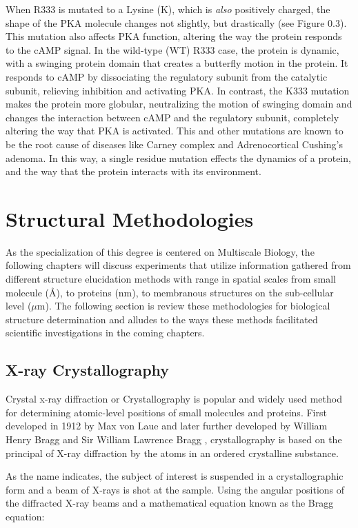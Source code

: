 \documentclass[12pt]{ucsddissertation}
\begin{document}
\begin{dissertationintroduction}
 When R333  is mutated to a Lysine (K), which is \textit{also} positively charged, the shape of the PKA molecule changes not slightly, but drastically (see Figure 0.3). This mutation also affects PKA function, altering the way the protein responds to the cAMP signal. In the wild-type (WT) R333 case, the protein is dynamic, with a swinging protein domain that creates a butterfly motion in the protein. It responds to cAMP by dissociating the regulatory subunit from the catalytic subunit, relieving inhibition and activating PKA. In contrast, the K333 mutation makes the protein more globular, neutralizing the motion of swinging domain\cite{Cheng2009} and changes the interaction between cAMP and the regulatory subunit, completely altering the way that PKA is activated. This and other mutations are known to be the root cause of diseases like Carney complex\cite{Kirschner2000} and Adrenocortical Cushing’s adenoma\cite{Calebiro2014}. In this way, a single residue mutation effects the dynamics of a protein, and the way that the protein interacts with its environment. 


\section{Structural Methodologies}

As the specialization of this degree is centered on Multiscale Biology, the following chapters will discuss experiments that utilize information gathered from different structure elucidation methods with range in spatial scales from small molecule (\si{\angstrom}), to proteins (nm), to membranous structures on the sub-cellular level ($\mu$m). The following section is review these methodologies for biological structure determination and alludes to the ways these methods facilitated scientific investigations in the coming chapters. 

\subsection{X-ray Crystallography}
Crystal x-ray diffraction or Crystallography is popular and widely used method for determining atomic-level positions of small molecules and proteins. First developed in 1912 by Max von Laue and later further developed by William Henry Bragg and Sir William Lawrence Bragg \cite{Bragg2014}, crystallography is based on the principal of X-ray diffraction by the atoms in an ordered crystalline substance. 

As the name indicates, the subject of interest is suspended in a crystallographic form and a beam of X-rays is shot at the sample. Using the angular positions of the diffracted X-ray beams and a mathematical equation known as the Bragg equation:


\end{dissertationintroduction}
\end{document}
